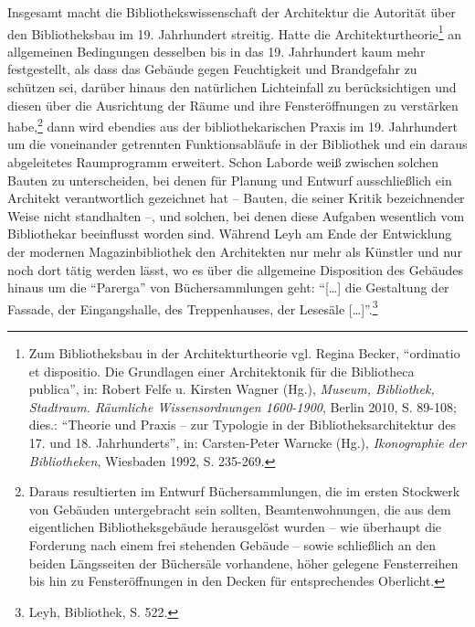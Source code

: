 Insgesamt macht die Bibliothekswissenschaft der Architektur die
Autorität über den Bibliotheksbau im 19. Jahrhundert streitig. Hatte die
Architekturtheorie\footnote{Zum Bibliotheksbau in der Architekturtheorie
  vgl. Regina Becker, \enquote{ordinatio et dispositio. Die Grundlagen
  einer Architektonik für die Bibliotheca publica}, in: Robert Felfe u.
  Kirsten Wagner (Hg.), \emph{Museum, Bibliothek, Stadtraum. Räumliche
  Wissensordnungen 1600-1900}, Berlin 2010, S. 89-108; dies.:
  \enquote{Theorie und Praxis -- zur Typologie in der
  Bibliotheksarchitektur des 17. und 18. Jahrhunderts}, in:
  Carsten-Peter Warncke (Hg.), \emph{Ikonographie der Bibliotheken},
  Wiesbaden 1992, S. 235-269.} an allgemeinen Bedingungen desselben bis
in das 19. Jahrhundert kaum mehr festgestellt, als dass das Gebäude
gegen Feuchtigkeit und Brandgefahr zu schützen sei, darüber hinaus den
natürlichen Lichteinfall zu berücksichtigen und diesen über die
Ausrichtung der Räume und ihre Fensteröffnungen zu verstärken
habe,\footnote{Daraus resultierten im Entwurf Büchersammlungen, die im
  ersten Stockwerk von Gebäuden untergebracht sein sollten,
  Beamtenwohnungen, die aus dem eigentlichen Bibliotheksgebäude
  herausgelöst wurden -- wie überhaupt die Forderung nach einem frei
  stehenden Gebäude -- sowie schließlich an den beiden Längsseiten der
  Büchersäle vorhandene, höher gelegene Fensterreihen bis hin zu
  Fensteröffnungen in den Decken für entsprechendes Oberlicht.} dann
wird ebendies aus der bibliothekarischen Praxis im 19. Jahrhundert um
die voneinander getrennten Funktionsabläufe in der Bibliothek und ein
daraus abgeleitetes Raumprogramm erweitert. Schon Laborde weiß zwischen
solchen Bauten zu unterscheiden, bei denen für Planung und Entwurf
ausschließlich ein Architekt verantwortlich gezeichnet hat -- Bauten,
die seiner Kritik bezeichnender Weise nicht standhalten --, und solchen,
bei denen diese Aufgaben wesentlich vom Bibliothekar beeinflusst worden
sind. Während Leyh am Ende der Entwicklung der modernen
Magazinbibliothek den Architekten nur mehr als Künstler und nur noch
dort tätig werden lässt, wo es über die allgemeine Disposition des
Gebäudes hinaus um die \enquote{Parerga} von Büchersammlungen geht:
\enquote{{[}\ldots{}{]} die Gestaltung der Fassade, der Eingangshalle,
des Treppenhauses, der Lesesäle {[}\ldots{}{]}}.\footnote{Leyh,
  Bibliothek, S. 522.}

